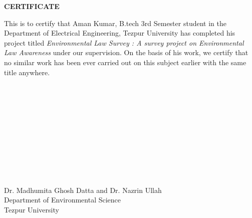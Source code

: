 \begin{titlepage}
    \begin{center}
        \textbf{{\Huge CERTIFICATE}}
    \end{center}
    
    \noindent    
{\Large This  is  to  certify  that  Aman Kumar,  B.tech  3rd  Semester 
student in the Department of Electrical Engineering, Tezpur  University  has  completed  his  project  titled  \emph{Environmental Law Survey : A survey project on Environmental Law Awareness}  under 
our supervision. 
On the basis of his work, we certify that no similar work has been ever 
carried out on this subject earlier with the same title anywhere. }
\\ \\ \\ \\ \\ \\
\\ \\ \\ \\ \\ \\

\noindent
{\Large Dr. Madhumita Ghosh Datta and Dr. Nazrin Ullah \\
Department of Environmental Science \\
Tezpur University \\}
\end{titlepage}